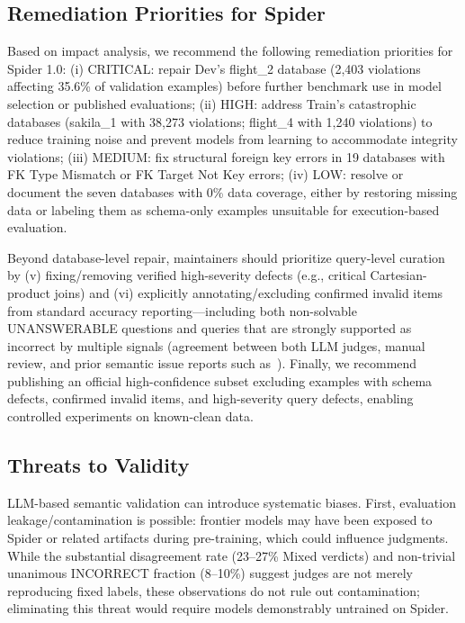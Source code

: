 \documentclass[]{einformatica}
\begin{document}
\subsection{Remediation Priorities for Spider}

Based on impact analysis, we recommend the following remediation priorities for Spider 1.0: (i) CRITICAL: repair Dev's flight\_2 database (2,403 violations affecting 35.6\% of validation examples) before further benchmark use in model selection or published evaluations; (ii) HIGH: address Train's catastrophic databases (sakila\_1 with 38,273 violations; flight\_4 with 1,240 violations) to reduce training noise and prevent models from learning to accommodate integrity violations; (iii) MEDIUM: fix structural foreign key errors in 19 databases with FK Type Mismatch or FK Target Not Key errors; (iv) LOW: resolve or document the seven databases with 0\% data coverage, either by restoring missing data or labeling them as schema-only examples unsuitable for execution-based evaluation.

Beyond database-level repair, maintainers should prioritize query-level curation by (v) fixing/removing verified high-severity defects (e.g., critical Cartesian-product joins) and (vi) explicitly annotating/excluding confirmed invalid items from standard accuracy reporting---including both non-solvable UNANSWERABLE questions and queries that are strongly supported as incorrect by multiple signals (agreement between both LLM judges, manual review, and prior semantic issue reports such as~\cite{liu2025nl2sqlbugs}). Finally, we recommend publishing an official high-confidence subset excluding examples with schema defects, confirmed invalid items, and high-severity query defects, enabling controlled experiments on known-clean data.

\subsection{Threats to Validity}

LLM-based semantic validation can introduce systematic biases. First, evaluation leakage/contamination is possible: frontier models may have been exposed to Spider or related artifacts during pre-training, which could influence judgments. While the substantial disagreement rate (23--27\% Mixed verdicts) and non-trivial unanimous INCORRECT fraction (8--10\%) suggest judges are not merely reproducing fixed labels, these observations do not rule out contamination; eliminating this threat would require models demonstrably untrained on Spider.
\end{document}
